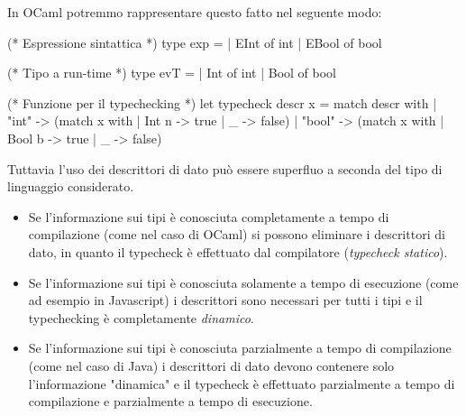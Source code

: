 In OCaml potremmo rappresentare questo fatto nel seguente modo:
\begin{OCaml}
    (* Espressione sintattica *)
    type exp =
        | EInt of int
        | EBool of bool
    
    (* Tipo a run-time *)
    type evT =
        | Int of int
        | Bool of bool

    (* Funzione per il typechecking *)
    let typecheck descr x = 
        match descr with
        | "int" -> (match x with
                    | Int n -> true
                    | _     -> false)
        | "bool" -> (match x with
                     | Bool b -> true
                     | _      -> false)
\end{OCaml}

Tuttavia l'uso dei descrittori di dato può essere superfluo a seconda del tipo di linguaggio considerato.
\begin{itemize}
    \item Se l'informazione sui tipi è conosciuta completamente a tempo di compilazione (come nel caso di OCaml) si possono eliminare i descrittori di dato, in quanto il typecheck è effettuato dal compilatore (\emph{typecheck statico}).
    \item Se l'informazione sui tipi è conosciuta solamente a tempo di esecuzione (come ad esempio in Javascript) i descrittori sono necessari per tutti i tipi e il typechecking è completamente \emph{dinamico}.
    \item Se l'informazione sui tipi è conosciuta parzialmente a tempo di compilazione (come nel caso di Java) i descrittori di dato devono contenere solo l'informazione "dinamica" e il typecheck è effettuato parzialmente a tempo di compilazione e parzialmente a tempo di esecuzione.
\end{itemize}